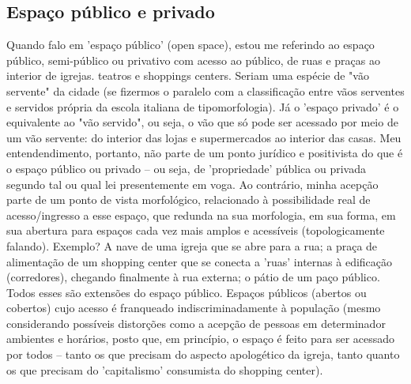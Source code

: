 \documentclass[]{report}
\begin{document}


	
	\subsection{Espaço público e privado}
	Quando falo em 'espaço público' (open space), estou me referindo ao espaço público, semi-público ou privativo com acesso ao público, de ruas e praças ao interior de igrejas. teatros e shoppings centers. Seriam uma espécie de "vão servente" da cidade (se fizermos o paralelo com a classificação entre vãos serventes e servidos própria da escola italiana de tipomorfologia). Já o 'espaço privado' é o equivalente ao "vão servido", ou seja, o vão que só pode ser acessado por meio de um vão servente: do interior das lojas e supermercados ao interior das casas. Meu entendendimento, portanto, não parte de um ponto jurídico e positivista do que é o espaço público ou privado – ou seja, de 'propriedade' pública ou privada segundo tal ou qual lei presentemente em voga. Ao contrário, minha acepção parte de um ponto de vista morfológico, relacionado à possibilidade real de acesso/ingresso a esse espaço, que redunda na sua morfologia, em sua forma, em sua abertura para espaços cada vez mais amplos e acessíveis (topologicamente falando). Exemplo? A nave de uma igreja que se abre para a rua; a praça de alimentação de um shopping center que se conecta a 'ruas' internas à edificação (corredores), chegando finalmente à rua externa; o pátio de um paço público. Todos esses são extensões do espaço público. Espaços públicos (abertos ou cobertos) cujo acesso é franqueado indiscriminadamente à população (mesmo considerando possíveis distorções como a acepção de pessoas em determinador ambientes e horários, posto que, em princípio, o espaço é feito para ser acessado por todos – tanto os que precisam do aspecto apologético da igreja, tanto quanto os que precisam do 'capitalismo' consumista do shopping center).
	
\end{document}

